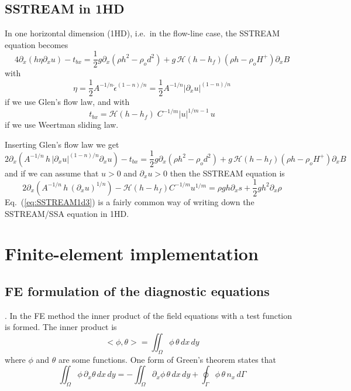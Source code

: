 \documentclass[10pt,a4paper]{book}
\newcommand{\He}{\mathcal{H}}
\newcommand{\p}{\partial}
\newcommand{\tbx}{t_{bx}}
\begin{document}
\section{SSTREAM in 1HD}

In one horizontal dimension (1HD), i.e.\ in the flow-line case, the SSTREAM equation becomes
\[
 4 \p_x ( h \eta   \p_x u ) - \tbx = \frac{1}{2} g \p_x (\rho h^2 - \rho_o d^2)+ g\,\He(h-h_f) (\rho h -\rho_o H^{+}) \p_x B 
\]
with
\[
\eta = \frac{1}{2} A^{-1/n} \dot{\epsilon}^{(1-n)/n} =  \frac{1}{2} A^{-1/n} |\p_x u|^{(1-n)/n} 
\]
if we use Glen's flow law, 
and with 
\[
t_{bx}   = \He(h-h_f) \; C^{-1/m} | u |^{1/m-1} \, u 
\]
if we use Weertman sliding law.

Inserting Glen's flow law we get
\begin{equation}
 2 \p_x ( A^{-1/n} \, h \, | \p_x u|^{(1-n)/n}   \p_x u ) - \tbx = \frac{1}{2} g \p_x (\rho h^2 - \rho_o d^2)+ g\,\He(h-h_f) (\rho h -\rho_o H^{+}) \p_x B 
\label{eq:SSTREAM1D}
\end{equation}
and if we can assume that $u>0$ and $\p_x u>0$  then the SSTREAM equation is
\begin{equation}
2 \p_x \left ( A^{-1/n} \, h \, (\p_x u)^{1/n}   \right ) - \He(h-h_f) C^{-1/m} u^{1/m} = \rho g h \p_x s + \frac{1}{2} g h^2 \p_x \rho 
\label{eq:SSTREAM1d3}
\end{equation}
Eq.~(\ref{eq:SSTREAM1d3}) is a fairly common way of writing down the SSTREAM/SSA equation in 1HD.

\chapter{Finite-element implementation}




\section{FE formulation of the diagnostic equations}
\label{sec:nBCs}.
In the FE method the inner product of the field equations with a test function is formed. The inner product is
\[
<\phi,\theta>=\iint_{\Omega}\phi \, \theta \, dx \, dy
\] 
where $\phi$ and $\theta$ are some functions.
One form of Green's theorem states that
\[
\iint_{\Omega}\phi \, \p_x \theta \, dx \, dy=-\iint_{\Omega} \p_x\phi \, \theta \, dx\,dy +\oint_{\Gamma}\phi \, \theta \, n_x\,d\Gamma
\]
\end{document}
